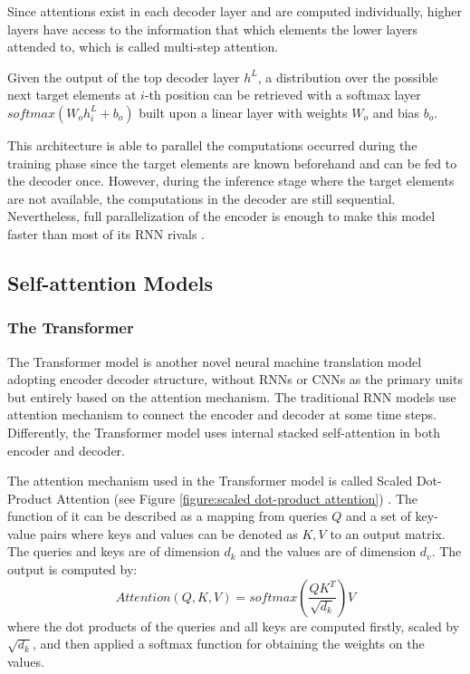 Since attentions exist in each decoder layer and are computed individually, higher layers have access to the information that which elements the lower layers attended to, which is called multi-step attention. 

Given the output of the top decoder layer $ h^{L} $, a distribution over the possible next target elements at $ i $-th position can be retrieved with a softmax layer $ softmax(W_{o}h_{i}^{L}+b_{o}) $ built upon a linear layer with weights $ W_{o} $ and bias $ b_{o} $. 

This architecture is able to parallel the computations occurred during the training phase since the target elements are known beforehand and can be fed to the decoder once. However, during the inference stage where the target elements are not available, the computations in the decoder are still sequential. Nevertheless, full parallelization of the encoder is enough to make this model faster than most of its RNN rivals \cite{gehring2017convs2s}.

\subsection{Self-attention Models}

\subsubsection*{The Transformer}

The Transformer model \cite{Vaswani2017} is another novel neural machine translation model adopting encoder decoder structure, without RNNs or CNNs as the primary units but entirely based on the attention mechanism. The traditional RNN models use attention mechanism to connect the encoder and decoder at some time steps. Differently, the Transformer model uses internal stacked self-attention in both encoder and decoder.

The attention mechanism used in the Transformer model is called Scaled Dot-Product Attention (see Figure \ref{figure:scaled dot-product attention}) \cite{Vaswani2017}. The function of it can be described as a mapping from queries $ Q $ and a set of key-value pairs where keys and values can be denoted as $ K, V $ to an output matrix. The queries and keys are of dimension $ d_{k} $ and the values are of dimension $ d_{v} $. The output is computed by:
\[ Attention(Q,K,V) = softmax(\frac{QK^{T}}{\sqrt{d_{k}}})V \]
where the dot products of the queries and all keys are computed firstly, scaled by $ \sqrt{d_{k}} $, and then applied a softmax function for obtaining the weights on the values.

